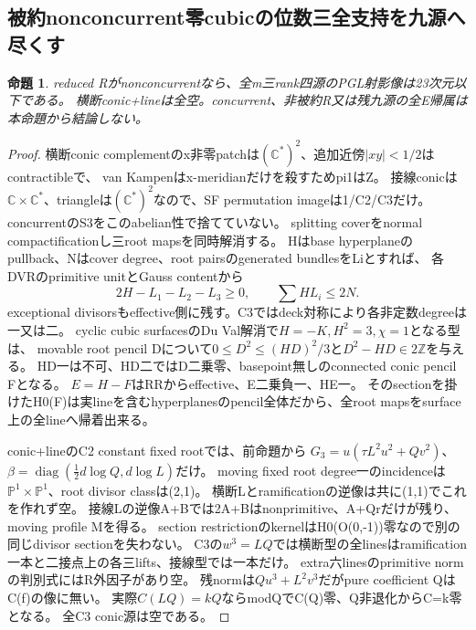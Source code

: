 \documentclass[a4paper,11pt]{ltjsarticle}
\newtheorem{proposition}{命題}[section]
\theoremstyle{definition}
\begin{document}
\subsection{被約nonconcurrent零cubicの位数三全支持を九源へ尽くす}
\begin{proposition}\label{prop:plane-reduced-nonconcurrent-m3-all-G}
reduced Rがnonconcurrentなら、全m三rank四源のPGL射影像は23次元以下である。
横断conic+lineは全空。concurrent、非被約R又は残九源の全E帰属は本命題から結論しない。
\end{proposition}
\begin{proof}
横断conic complementのx非零patchは$(\mathbb C^*)^2$、追加近傍$|xy|<1/2$はcontractibleで、
van Kampenはx-meridianだけを殺すためpi1はZ。
接線conicは$\mathbb C\times\mathbb C^*$、triangleは$(\mathbb C^*)^2$なので、SF permutation imageは1/C2/C3だけ。
concurrentのS3をこのabelian性で捨てていない。
splitting coverをnormal compactificationし三root mapsを同時解消する。
Hはbase hyperplaneのpullback、Nはcover degree、root pairsのgenerated bundlesをLiとすれば、
各DVRのprimitive unitとGauss contentから
\[
 2H-L_1-L_2-L_3\ge0,\qquad\sum H L_i\le2N.
\]
exceptional divisorsもeffective側に残す。C3ではdeck対称により各非定数degreeは一又は二。
cyclic cubic surfacesのDu Val解消で$H=-K,H^2=3,\chi=1$となる型は、
movable root pencil Dについて$0\le D^2\le(HD)^2/3$と$D^2-HD\in2\mathbb Z$を与える。
HD一は不可、HD二ではD二乗零、basepoint無しのconnected conic pencil Fとなる。
$E=H-F$はRRからeffective、E二乗負一、HE一。
そのsectionを掛けたH0(F)は実lineを含むhyperplanesのpencil全体だから、全root mapsをsurface上の全lineへ帰着出来る。

conic+lineのC2 constant fixed rootでは、前命題から
$G_3=u(\tau L^2u^2+Qv^2)$、$\beta=\operatorname{diag}(\tfrac12d\log Q,d\log L)$だけ。
moving fixed root degree一のincidenceは$\mathbb P^1\times\mathbb P^1$、root divisor classは(2,1)。
横断Lとramificationの逆像は共に(1,1)でこれを作れず空。
接線Lの逆像A+Bでは2A+Bはnonprimitive、A+Qrだけが残り、moving profile Mを得る。
section restrictionのkernelはH0(O(0,-1))零なので別の同じdivisor sectionを失わない。
C3の$w^3=LQ$では横断型の全linesはramification一本と二接点上の各三lifts、接線型では一本だけ。
extra六linesのprimitive normの判別式にはR外因子があり空。
残normは$Qu^3+L^2v^3$だがpure coefficient QはC(f)の像に無い。
実際$C(LQ)=kQ$ならmodQでC(Q)零、Q非退化からC=k零となる。
全C3 conic源は空である。


\end{proof}
\end{document}
